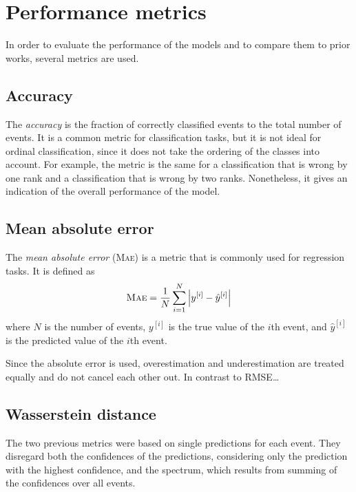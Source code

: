 \section{Performance metrics}
In order to evaluate the performance of the models
and to compare them to prior works,
several metrics are used.


\subsection{Accuracy}
The \emph{accuracy} is the fraction of correctly classified events to the total number of events.
It is a common metric for classification tasks,
but it is not ideal for ordinal classification,
  since it does not take the ordering of the classes into account.
For example,
the metric is the same for
a classification that is wrong by one rank
and a classification that is wrong by two ranks.
%
Nonetheless,
it gives an indication of the overall performance of the model.


\subsection{Mean absolute error}
The \emph{mean absolute error} (\textsc{Mae}) is a metric that is commonly used for regression tasks. %
It is defined as
\begin{equation}
  \text{\textsc{Mae}} = \frac{1}{N} \sum_{i=1}^N \left| y^{[i]} - \hat{y}^{[i]} \right|
\end{equation}
where $N$ is the number of events,
$y^{[i]}$ is the true value of the $i$th event,
and $\hat{y}^{[i]}$ is the predicted value of the $i$th event. %


Since the absolute error is used,
overestimation and underestimation are treated equally
and do not cancel each other out.
In contrast to RMSE… %


\subsection{Wasserstein distance}
The two previous metrics were based on single predictions for each event.
They disregard both
  the confidences of the predictions,
    considering only the prediction with the highest confidence,
  and the spectrum,
    which results from summing of the confidences over all events.

